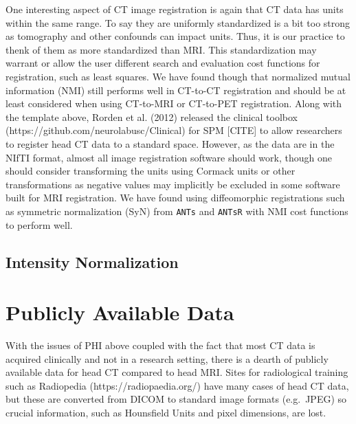 \documentclass[]{elsarticle} %
\begin{document}
One interesting aspect of CT image registration is again that CT data
has units within the same range. To say they are uniformly standardized
is a bit too strong as tomography and other confounds can impact units.
Thus, it is our practice to thenk of them as more standardized than MRI.
This standardization may warrant or allow the user different search and
evaluation cost functions for registration, such as least squares. We
have found though that normalized mutual information (NMI) still
performs well in CT-to-CT registration and should be at least considered
when using CT-to-MRI or CT-to-PET registration. Along with the template
above, Rorden et al. (2012) released the clinical toolbox
(https://github.com/neurolabusc/Clinical) for SPM {[}CITE{]} to allow
researchers to register head CT data to a standard space. However, as
the data are in the NIfTI format, almost all image registration software
should work, though one should consider transforming the units using
Cormack units or other transformations as negative values may implicitly
be excluded in some software built for MRI registration. We have found
using diffeomorphic registrations such as symmetric normalization (SyN)
from \texttt{ANTs} and \texttt{ANTsR} with NMI cost functions to perform
well.

\hypertarget{intensity-normalization}{%
\subsection{Intensity Normalization}\label{intensity-normalization}}

\hypertarget{publicly-available-data}{%
\section{Publicly Available Data}\label{publicly-available-data}}

With the issues of PHI above coupled with the fact that most CT data is
acquired clinically and not in a research setting, there is a dearth of
publicly available data for head CT compared to head MRI. Sites for
radiological training such as Radiopedia (https://radiopaedia.org/) have
many cases of head CT data, but these are converted from DICOM to
standard image formats (e.g.~JPEG) so crucial information, such as
Hounsfield Units and pixel dimensions, are lost.
\end{document}
